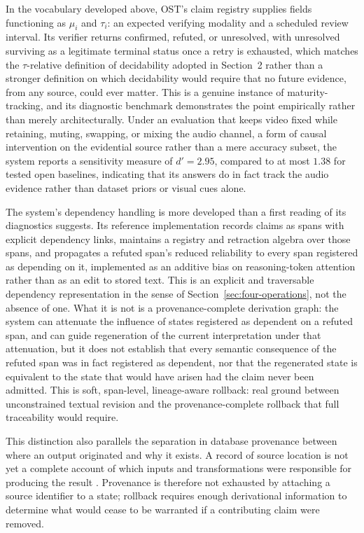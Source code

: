 \documentclass[11pt]{article}
\begin{document}
In the vocabulary developed above, OST's claim registry supplies fields functioning as $\mu_i$ and $\tau_i$: an expected verifying modality and a scheduled review interval. Its verifier returns confirmed, refuted, or unresolved, with unresolved surviving as a legitimate terminal status once a retry is exhausted, which matches the $\tau$-relative definition of decidability adopted in Section~2 rather than a stronger definition on which decidability would require that no future evidence, from any source, could ever matter. This is a genuine instance of maturity-tracking, and its diagnostic benchmark demonstrates the point empirically rather than merely architecturally. Under an evaluation that keeps video fixed while retaining, muting, swapping, or mixing the audio channel, a form of causal intervention on the evidential source rather than a mere accuracy subset, the system reports a sensitivity measure of $d' = 2.95$, compared to at most $1.38$ for tested open baselines, indicating that its answers do in fact track the audio evidence rather than dataset priors or visual cues alone.

The system's dependency handling is more developed than a first reading of its diagnostics suggests. Its reference implementation records claims as spans with explicit dependency links, maintains a registry and retraction algebra over those spans, and propagates a refuted span's reduced reliability to every span registered as depending on it, implemented as an additive bias on reasoning-token attention rather than as an edit to stored text. This is an explicit and traversable dependency representation in the sense of Section~\ref{sec:four-operations}, not the absence of one. What it is not is a provenance-complete derivation graph: the system can attenuate the influence of states registered as dependent on a refuted span, and can guide regeneration of the current interpretation under that attenuation, but it does not establish that every semantic consequence of the refuted span was in fact registered as dependent, nor that the regenerated state is equivalent to the state that would have arisen had the claim never been admitted. This is soft, span-level, lineage-aware rollback: real ground between unconstrained textual revision and the provenance-complete rollback that full traceability would require.

This distinction also parallels the separation in database provenance between where an output originated and why it exists. A record of source location is not yet a complete account of which inputs and transformations were responsible for producing the result \cite{BunemanKhannaTan2001}. Provenance is therefore not exhausted by attaching a source identifier to a state; rollback requires enough derivational information to determine what would cease to be warranted if a contributing claim were removed.
\end{document}
